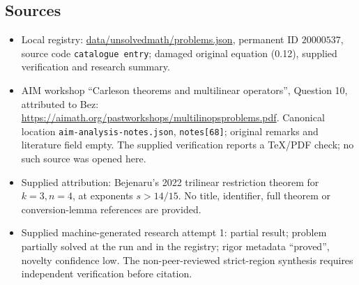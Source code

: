 \documentclass[11pt]{article}
\begin{document}
\subsection{Sources}
\begin{itemize}
\item Local registry: \url{data/unsolvedmath/problems.json}, permanent ID $20000537$, source code \texttt{catalogue entry}; damaged original equation (0.12), supplied verification and research summary.
\item AIM workshop ``Carleson theorems and multilinear operators'', Question 10, attributed to Bez: \url{https://aimath.org/pastworkshops/multilinopsproblems.pdf}. Canonical location \texttt{aim-analysis-notes.json}, \texttt{notes[68]}; original remarks and literature field empty. The supplied verification reports a TeX/PDF check; no such source was opened here.
\item Supplied attribution: Bejenaru's 2022 trilinear restriction theorem for $k=3,n=4$, at exponents $s>14/15$. No title, identifier, full theorem or conversion-lemma references are provided.
\item Supplied machine-generated research attempt 1: partial result; problem partially solved at the run and in the registry; rigor metadata ``proved'', novelty confidence low. The non-peer-reviewed strict-region synthesis requires independent verification before citation.
\end{itemize}
\end{document}
